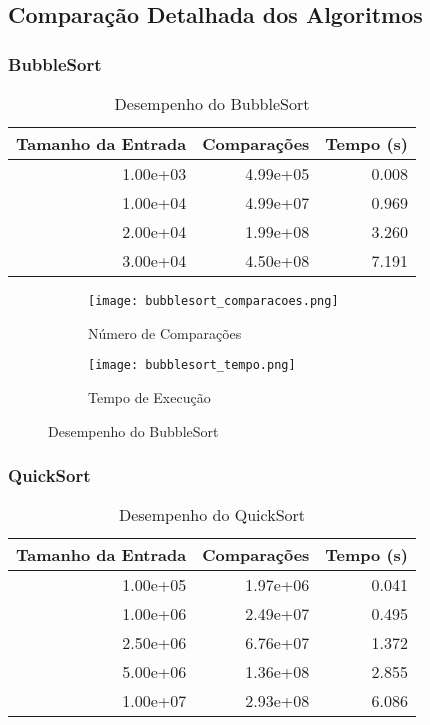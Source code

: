 \documentclass[a4paper,12pt]{article}
\begin{document}
\subsection{Comparação Detalhada dos Algoritmos}

\subsubsection{BubbleSort}

\begin{table}[H]
    \centering
    \caption{Desempenho do BubbleSort}
    \label{tab:bubblesort}
    \begin{tabular}{@{}rrr@{}}
        \toprule
        \textbf{Tamanho da Entrada} & \textbf{Comparações} & \textbf{Tempo (s)} \\ \midrule
       1.00e+03 & 4.99e+05 & 0.008 \\
       
1.00e+04 & 4.99e+07 & 0.969 \\
2.00e+04 & 1.99e+08 & 3.260 \\
3.00e+04 & 4.50e+08 & 7.191 \\
        \bottomrule
    \end{tabular}
\end{table}

\begin{figure}[H]
    \centering
    \begin{subfigure}[b]{0.6\textwidth} %
        \texttt{[image: bubblesort\_comparacoes.png]}
        \caption{Número de Comparações}
        \label{fig:bubblesort_comparacoes}
    \end{subfigure}
    \hfill
    \begin{subfigure}[b]{0.6\textwidth} %
        \texttt{[image: bubblesort\_tempo.png]}
        \caption{Tempo de Execução}
        \label{fig:bubblesort_tempo}
    \end{subfigure}
    \caption{Desempenho do BubbleSort}
    \label{fig:bubblesort}
\end{figure}

\subsubsection{QuickSort}

\begin{table}[H]
    \centering
    \caption{Desempenho do QuickSort}
    \label{tab:quicksort}
    \begin{tabular}{@{}rrr@{}}
        \toprule
        \textbf{Tamanho da Entrada} & \textbf{Comparações} & \textbf{Tempo (s)} \\ \midrule
        1.00e+05 & 1.97e+06 & 0.041 \\
1.00e+06 & 2.49e+07 & 0.495 \\
2.50e+06 & 6.76e+07 & 1.372 \\
5.00e+06 & 1.36e+08 & 2.855 \\
1.00e+07 & 2.93e+08 & 6.086 \\             
        \bottomrule
    \end{tabular}
\end{table}
\end{document}
